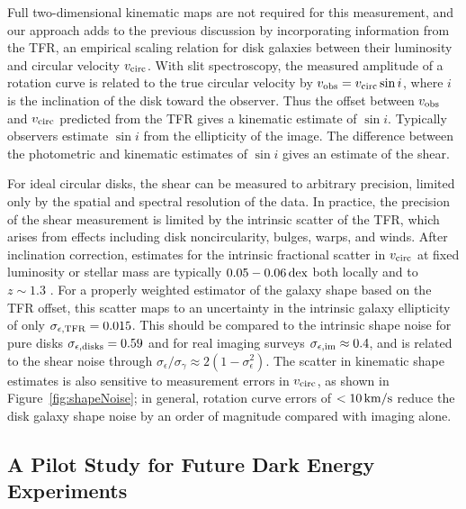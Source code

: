 \documentclass[12pt]{article}
\begin{document}
Full two-dimensional kinematic maps are not required for this measurement, and our approach adds to the previous discussion by incorporating information from the TFR, an empirical scaling relation for disk galaxies between their luminosity and circular velocity $v_{\rm circ}$. With slit spectroscopy, the measured amplitude of a rotation curve is related to the true circular velocity by $v_{\rm obs} = v_{\rm circ} \sin i$, where $i$ is the inclination of the disk toward the observer. Thus the offset between $v_{\rm obs}$ and $v_{\rm circ}$ predicted from the TFR gives a kinematic estimate of $\sin i$. Typically observers estimate $\sin i$ from the ellipticity of the image. The difference between the photometric and kinematic estimates of $\sin i$ gives an estimate of the shear.

For ideal circular disks, the shear can be measured to arbitrary precision, limited only by the spatial and spectral resolution of the data. In practice, the precision of the shear measurement is limited by the intrinsic scatter of the TFR, which arises from effects including disk noncircularity, bulges, warps, and winds. After inclination correction, estimates for the intrinsic fractional scatter in $v_{\rm circ}$ at fixed luminosity or stellar mass are typically $0.05-0.06\,{\rm dex}$ both locally and to $z\sim1.3$ \citep{Reyes2011, Miller2011}. For a properly weighted estimator of the galaxy shape based on the TFR offset, this scatter maps to an uncertainty in the intrinsic galaxy ellipticity of only $\sigma_{\epsilon, {\rm TFR}}=0.015$. This should be compared to the intrinsic shape noise for pure disks $\sigma_{\epsilon, {\rm disks}}=0.59$ and for real imaging surveys $\sigma_{\epsilon, {\rm im}}\approx0.4$, and is related to the shear noise through $\sigma_\epsilon / \sigma_\gamma \approx 2(1-\sigma_\epsilon^2)$\citep{Bernstein2002, Hirata2004}. The scatter in kinematic shape estimates is also sensitive to measurement errors in $v_{\rm circ}$, as shown in Figure~\ref{fig:shapeNoise}; in general, rotation curve errors of $<10\,{\rm km/s}$ reduce the disk galaxy shape noise by an order of magnitude compared with imaging alone.

\subsection{A Pilot Study for Future Dark Energy Experiments}
\end{document}
